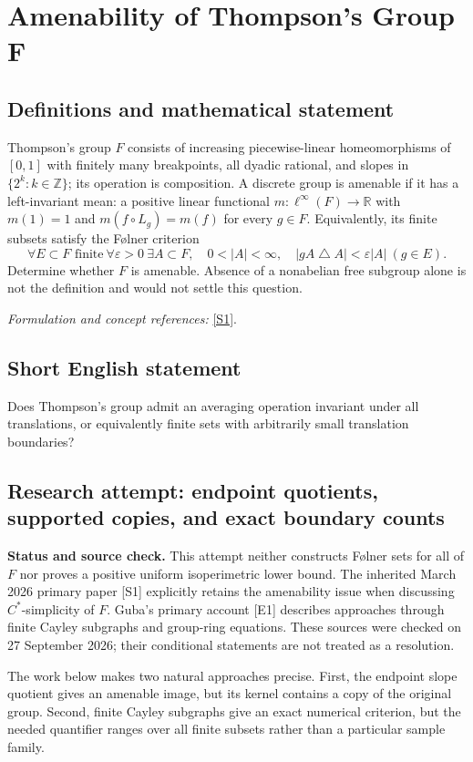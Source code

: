 \documentclass[11pt]{article}
\begin{document}
\section*{\texorpdfstring{Amenability of Thompson's Group F}{Amenability of Thompson's Group F}}\label{304}
\subsection{Definitions and mathematical statement}
Thompson's group $F$ consists of increasing piecewise-linear homeomorphisms of $[0,1]$ with finitely many breakpoints, all dyadic rational, and slopes in $\{2^k:k\in{\mathbb{Z}}\}$; its operation is composition. A discrete group is amenable if it has a left-invariant mean: a positive linear functional $m:\ell^\infty(F)\to{\mathbb{R}}$ with $m(1)=1$ and $m(f\circ L_g)=m(f)$ for every $g\in F$. Equivalently, its finite subsets satisfy the F\o lner criterion
\[
 \forall E\subset F\text{ finite}\ \forall{\varepsilon}>0\ \exists A\subset F,
 \quad0<|A|<\infty,\quad |gA\mathbin{\triangle} A|<{\varepsilon}|A|\ (g\in E).
\]
Determine whether $F$ is amenable. Absence of a nonabelian free subgroup alone is not the definition and would not settle this question.
\par\smallskip\textit{Formulation and concept references:} \href{https://arxiv.org/abs/2603.28228}{[S1]}.

\subsection{Short English statement}
Does Thompson's group admit an averaging operation invariant under all translations, or equivalently finite sets with arbitrarily small translation boundaries?
\subsection{Research attempt: endpoint quotients, supported copies, and exact boundary counts}
\textbf{Status and source check.} This attempt neither constructs F\o lner sets for all of $F$ nor proves a positive uniform isoperimetric lower bound. The inherited March 2026 primary paper [S1] explicitly retains the amenability issue when discussing $C^*$-simplicity of $F$. Guba's primary account [E1] describes approaches through finite Cayley subgraphs and group-ring equations. These sources were checked on 27 September 2026; their conditional statements are not treated as a resolution.

The work below makes two natural approaches precise. First, the endpoint slope quotient gives an amenable image, but its kernel contains a copy of the original group. Second, finite Cayley subgraphs give an exact numerical criterion, but the needed quantifier ranges over all finite subsets rather than a particular sample family.
\end{document}
